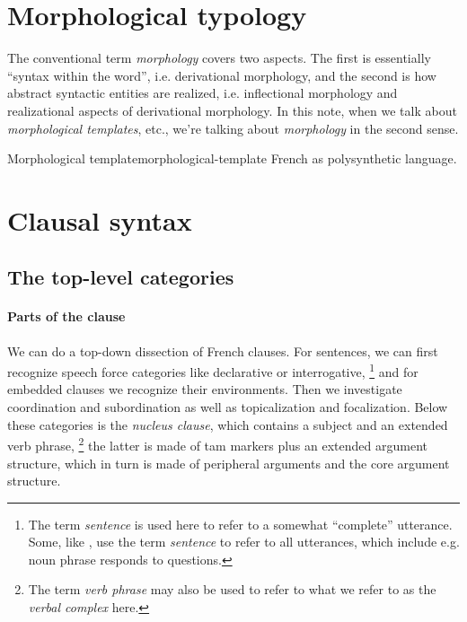 \documentclass[a4paper, oneside, 12pt]{report}
\newcommand*{\term}[1]{\emph{#1}}
\begin{document}
\section{Morphological typology}

The conventional term \term{morphology} covers two aspects.
The first is essentially ``syntax within the word'',
i.e. derivational morphology,
and the second is how abstract syntactic entities are realized,
i.e. inflectional morphology and realizational aspects of derivational morphology.
In this note, when we talk about \term{morphological templates}, etc.,
we're talking about \term{morphology} in the second sense.

\begin{todobox}{Morphological template}{morphological-template}
    French as polysynthetic language.
\end{todobox}

\section{Clausal syntax}

\subsection{The top-level categories}

\paragraph*{Parts of the clause}
We can do a top-down dissection of French clauses.
For sentences, we can first recognize speech force categories like declarative or interrogative,%
\footnote{
    The term \term{sentence} is used here to refer to a somewhat ``complete'' utterance.
    Some, like \citet{cgel}, use the term \term{sentence} to refer to all utterances,
    which include e.g. noun phrase responds to questions.
}
and for embedded clauses we recognize their environments.
Then we investigate coordination and subordination
as well as topicalization and focalization.
Below these categories is the \term{nucleus clause},
which contains a subject and an extended verb phrase,%
\footnote{
    The term \term{verb phrase} may also be used to refer to what we refer to as the \term{verbal complex} here.
}
the latter is made of \ac{tam} markers plus an extended argument structure,
which in turn is made of peripheral arguments and the core argument structure.
\end{document}
